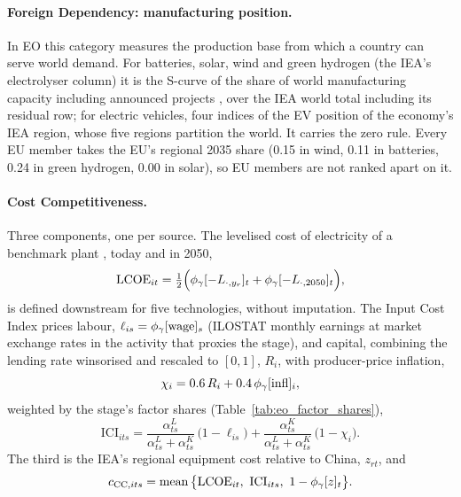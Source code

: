 \paragraph{Foreign Dependency: manufacturing position.}\label{subsec:eo_fd} In EO this category
measures the production base from which a country can serve world demand. For batteries, solar,
wind and green hydrogen (the IEA's electrolyser column) it is the S-curve of the share of world
manufacturing capacity including announced projects \citep{iea2024etp}, over the IEA world total
including its residual row; for electric vehicles, four indices of the EV position of the
economy's IEA region, whose five regions partition the world. It carries the zero rule. Every EU
member takes the EU's regional 2035 share (0.15 in wind, 0.11 in batteries, 0.24 in green hydrogen,
0.00 in solar), so EU members are not ranked apart on it.

\paragraph{Cost Competitiveness.}\label{subsec:eo_cost} Three components, one per source. The
levelised cost of electricity of a benchmark plant \citep{bnef2024neo}, today and in 2050,
\begin{equation}\label{eq:eo_lcoe}
  \mathrm{LCOE}_{it}=\tfrac12\Big(\phi_{\gamma}[-L_{\cdot,y_r}]_t+\phi_{\gamma}[-L_{\cdot,2050}]_t\Big),
\end{equation}
is defined downstream for five technologies, without imputation. The Input Cost Index prices
labour, $\ell_{is}=\phi_{\gamma}[\mathrm{wage}]_s$ (ILOSTAT monthly earnings at market exchange rates in
the activity that proxies the stage), and capital, combining the lending rate winsorised and
rescaled to $[0,1]$, $R_i$, with producer-price inflation,
\begin{equation}\label{eq:eo_capital}
  \chi_i=0.6\,R_i+0.4\,\phi_{\gamma}[\mathrm{infl}]_i ,
\end{equation}
weighted by the stage's factor shares (Table~\ref{tab:eo_factor_shares}),
\begin{equation}\label{eq:eo_ici}
  \mathrm{ICI}_{its}=\frac{\alpha^{L}_{ts}}{\alpha^{L}_{ts}+\alpha^{K}_{ts}}\,\big(1-\ell_{is}\big)
  +\frac{\alpha^{K}_{ts}}{\alpha^{L}_{ts}+\alpha^{K}_{ts}}\,\big(1-\chi_i\big).
\end{equation}
The third is the IEA's regional equipment cost relative to China, $z_{rt}$, and
\begin{equation}\label{eq:eo_cost}
  c_{\mathrm{CC},its}=\mean\big\{\mathrm{LCOE}_{it},\ \mathrm{ICI}_{its},\ 1-\Scurve[z]_{t}\big\}.
\end{equation}

